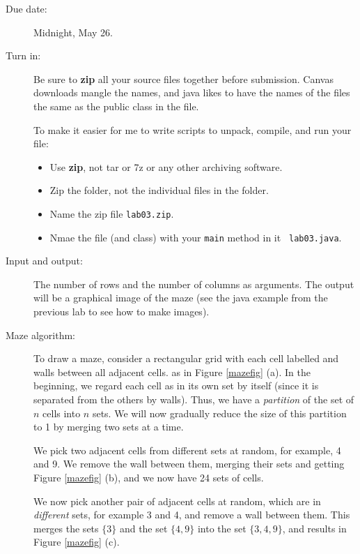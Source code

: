\documentclass{article}
\newcommand{\set}[1]{\ensuremath{\{#1\}}}
\begin{document}
\begin{description}

\item[Due date:] Midnight, May 26.

\item[Turn in:] Be sure to {\bf zip} all your source files together
  before submission.  Canvas downloads mangle the names, and java
  likes to have the names of the files the same as the public class in
  the file.

  To make
  it easier for me to write scripts to unpack, compile, and run your
  file:
  \begin{itemize}
    \item
      Use {\bf zip}, not tar or 7z or any other archiving software.
      \item Zip the folder, not the individual  files in the folder.
      \item Name the zip file {\tt lab03.zip}.
\item
  Nmae the file (and class) with your {\tt main} method in it {\tt
    lab03.java}. 
  \end{itemize}

\item[Input and output:]  The number of rows and the number of
  columns as arguments.  The output will be a graphical image of the
  maze (see the java example from the previous lab to see how to make
  images). 
  
\item[Maze algorithm:] To draw a maze, consider a rectangular grid
  with each cell labelled and walls between all adjacent cells. as in
  Figure \ref{mazefig} (a).  In the beginning, we regard each cell as
  in its own set by itself (since it is separated from the others by
  walls).  Thus, we have a {\em partition} of the set of $n$ cells
  into $n$ sets.  We will now gradually reduce the size of this
  partition to 1 by merging two sets at a time.

  We pick two adjacent cells from different sets at random, for
  example, 4 and 9.  We remove the wall between them, merging their
  sets and getting Figure \ref{mazefig} (b), and we now have 24 sets
  of cells.

  We now pick another pair of adjacent cells at random, which are in
  {\em different} sets, for example 3 and 4, and remove a wall between
  them.  This merges the sets \set{3} and the set \set{4,9} into the
  set \set{3,4,9}, and results in Figure \ref{mazefig} (c).



\end{description}
\end{document}
